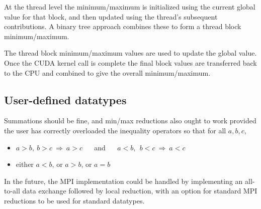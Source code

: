 \documentclass[12pt]{article}
\begin{document}
At the thread level the minimum/maximum is initialized using the current
global value for that block, and then updated using the thread's subsequent
contributions.  A binary tree approach combines these to form a thread
block minimum/maximum.

The thread block minimum/maximum values are used to update the global value.
Once the CUDA kernel call is complete the final block values are transferred
back to the CPU and combined to give the overall minimum/maximum.

\subsection{User-defined datatypes}

Summations should be fine, and min/max reductions also ought to work
provided the user has correctly overloaded the inequality operators
so that for all $a, b, c$,
\begin{itemize}
\item\vspace*{-0.1in} $a\!>\!b,\  b\!>\!c\ \Longrightarrow\ a\!>\!c$
           ~~ and ~~   $a\!<\!b,\ \ b\!<\!c\ \Longrightarrow\ a\!<\!c$
\item\vspace*{-0.1in}  either $a\!<\!b$, or $a\!>\!b$, or $a\!=\!b$
\end{itemize}

In the future, the MPI implementation could be handled by
implementing an all-to-all data exchange followed by local reduction,
with an option for standard MPI reductions to be used for standard datatypes.
\end{document}
